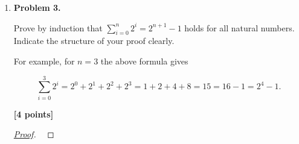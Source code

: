 \documentclass[11pt]{article}
\begin{document}
\begin{enumerate}
Prove by induction that \(n^3 + 2n\) is divisible by \(3\) for all natural numbers. Indicate the structure of your proof clearly.

\begin{flushright}
\textbf{[4 points]}
\end{flushright}

\begin{proof}[\underline{Proof}]
\

\underline{Base case.} If $n=1$, then \(n^3+2n = 1^3 + 2\cdot 1 = 3\), which is divisible by $3$. (If one includes $n=0$ as natural, then $0^3 + 2\cdot 0 = 0$ is also divisible by $3$.)

\underline{Inductive hypothesis.} Assume that for some $k \in \mathbb{N}$, the number $k^3 + 2k$ is divisible by $3$, i.e.,
\[
k^3 + 2k = 3m \quad \text{for some } m \in \mathbb{Z}.
\]

\underline{Inductive step.} We must show that $(k+1)^3 + 2(k+1)$ is also divisible by $3$:

\[
\begin{aligned}
(k+1)^3+2(k+1)
&= \big(k^3+3k^2+3k+1\big)+2k+2 \\
&= \underbrace{(k^3+2k)}_{\text{multiple of }3 \text{ by IH}} \;+\; \underbrace{3k^2+3k+3}_{=3(k^2+k+1)}.
\end{aligned}
\]

By the inductive hypothesis, $k^3+2k$ is divisible by $3$, and clearly $3(k^2+k+1)$ is also divisible by $3$.  
Thus, their sum is divisible by $3$.

\underline{Conclusion.} By the principle of mathematical induction, $n^3 + 2n$ is divisible by $3$ for all natural numbers $n$.

\end{proof}

\item \textbf{Problem 3.}

Prove by induction that \(\displaystyle\sum_{i=0}^{n} 2^i = 2^{n+1} - 1\) holds for all natural numbers. Indicate the structure of your proof clearly.

For example, for \(n=3\) the above formula gives

\[
\sum_{i=0}^{3} 2^i = 2^0 + 2^1 + 2^2 + 2^3 = 1 + 2 + 4 + 8 = 15 = 16 - 1 = 2^4 - 1.
\]

\begin{flushright}
\textbf{[4 points]}
\end{flushright}

\begin{proof}[\underline{Proof}]
\


\end{proof}
\end{enumerate}
\end{document}
